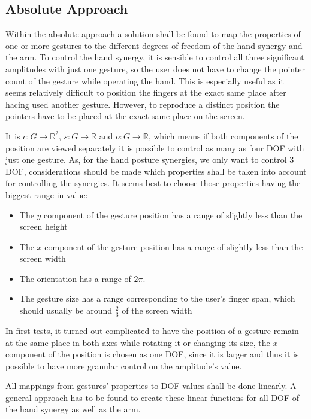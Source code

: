 \subsection{Absolute Approach}
\label{sec:synergies:absolute}

Within the absolute approach a solution shall be found to map the properties of one or more gestures to the different degrees of freedom of the hand synergy and the arm. To control the hand synergy, it is sensible to control all three significant amplitudes with just one gesture, so the user does not have to change the pointer count of the gesture while operating the hand. This is especially useful as it seems relatively difficult to position the fingers at the exact same place after hacing used another gesture. However, to reproduce a distinct position the pointers have to be placed at the exact same place on the screen.

It is $c:G\rightarrow\mathbb{R}^2$, $s:G\rightarrow\mathbb{R}$ and $o:G\rightarrow\mathbb{R}$, which means if both components of the position are viewed separately it is possible to control as many as four DOF with just one gesture. As, for the hand posture synergies, we only want to control 3 DOF, considerations should be made which properties shall be taken into account for controlling the synergies. It seems best to choose those properties having the biggest range in value:
\begin{itemize}
	\item The $y$ component of the gesture position has a range of slightly less than the screen height
	\item The $x$ component of the gesture position has a range of slightly less than the screen width
	\item The orientation has a range of $2\pi$.
	\item The gesture size has a range corresponding to the user's finger span, which should usually be around $\frac{2}{3}$ of the screen width
\end{itemize}

In first tests, it turned out complicated to have the position of a gesture remain at the same place in both axes while rotating it or changing its size, the $x$ component of the position is chosen as one DOF, since it is larger and thus it is possible to have more granular control on the amplitude's value.

All mappings from gestures' properties to DOF values shall be done linearly. A general approach has to be found to create these linear functions for all DOF of the hand synergy as well as the arm.

